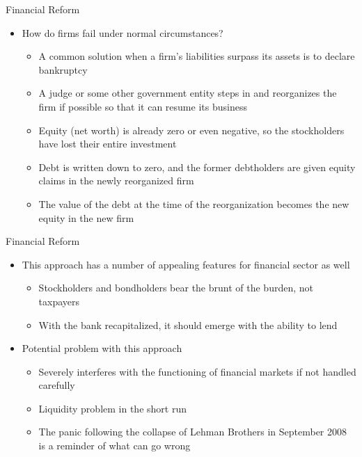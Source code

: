 \documentclass[aspectratio=1610]{beamer}
\begin{document}
\begin{frame}[wide]{Financial Reform}
	\begin{itemize}
		\item How do firms fail under normal circumstances?
		\begin{itemize}
			\item A common solution when a firm's liabilities surpass its assets is to declare bankruptcy
			\item A judge or some other government entity steps in and reorganizes the firm if possible so that it can resume its business
			\item Equity (net worth) is already zero or even negative, so the stockholders have lost their entire investment
			\item Debt is written down to zero, and the former debtholders are given equity claims in the newly reorganized firm
			\item The value of the debt at the time of the reorganization becomes the new equity in the new firm
		\end{itemize}
	\end{itemize}
\end{frame}

\begin{frame}[wide]{Financial Reform}
	\begin{itemize}
		\item This approach has a number of appealing features for financial sector as well
		\begin{itemize}
			\item Stockholders and bondholders bear the brunt of the burden, not taxpayers
			\item With the bank recapitalized, it should emerge with the ability to lend
		\end{itemize} 
		\item Potential problem with this approach
		\begin{itemize}
			\item Severely interferes with the functioning of financial markets if not handled carefully
			\item Liquidity problem in the short run
			\item The panic following the collapse of Lehman Brothers in September 2008 is a reminder of what can go wrong
		\end{itemize}
	\end{itemize}
\end{frame}
\end{document}
